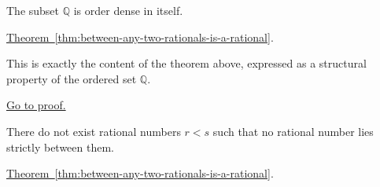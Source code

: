 \begin{tcolorbox}[colback=thmbox, colframe=thmborder, arc=2pt,
  left=6pt, right=6pt, top=4pt, bottom=4pt,
  title={\small\textbf{Corollary ($\mathbb{Q}$ Is Dense in Itself)}},
  fonttitle=\small\bfseries]
\begin{corollary}
\label{cor:q-dense-in-itself}
The subset $\mathbb{Q}$ is order dense in itself.
\end{corollary}
\end{tcolorbox}

\begin{remark*}[Dependencies]
\hyperref[thm:between-any-two-rationals-is-a-rational]{Theorem~\ref*{thm:between-any-two-rationals-is-a-rational}}.
\end{remark*}

\begin{remark*}
This is exactly the content of the theorem above, expressed as a structural
property of the ordered set $\mathbb{Q}$.
\end{remark*}

\begin{remark*}[Proof]
\hyperref[prf:q-dense-in-itself]{Go to proof.}
\end{remark*}

\begin{tcolorbox}[colback=thmbox, colframe=thmborder, arc=2pt,
  left=6pt, right=6pt, top=4pt, bottom=4pt,
  title={\small\textbf{Corollary (The Rational Numbers Have No Adjacent Points)}},
  fonttitle=\small\bfseries]
\begin{corollary}
\label{cor:q-has-no-adjacent-points}
There do not exist rational numbers $r<s$ such that no rational number lies
strictly between them.
\end{corollary}
\end{tcolorbox}

\begin{remark*}[Dependencies]
\hyperref[thm:between-any-two-rationals-is-a-rational]{Theorem~\ref*{thm:between-any-two-rationals-is-a-rational}}.
\end{remark*}

